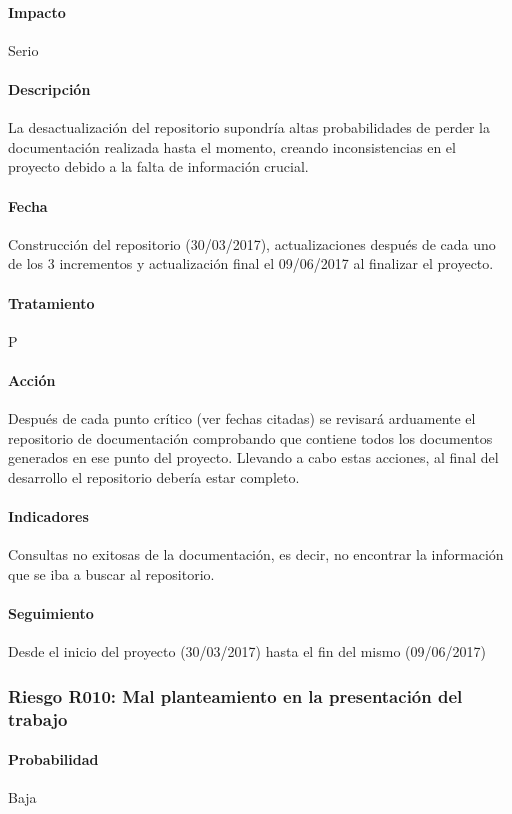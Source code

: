 \documentclass[10pt,a4paper]{article}
\begin{document}
				\paragraph{Impacto}	Serio
				\paragraph{Descripción} La desactualización del repositorio supondría altas probabilidades de perder la documentación realizada hasta el momento, creando inconsistencias en el proyecto debido a la falta de información crucial. 
				\paragraph{Fecha} Construcción del repositorio (30/03/2017), actualizaciones después de cada uno de los 3 incrementos y actualización final el 09/06/2017 al finalizar el proyecto.
				\paragraph{Tratamiento} P
				\paragraph{Acción} Después de cada punto crítico (ver fechas citadas) se revisará arduamente el repositorio de documentación comprobando que contiene todos los documentos generados en ese punto del proyecto.	Llevando a cabo estas acciones, al final del desarrollo el repositorio debería estar completo.			
				\paragraph{Indicadores} Consultas no exitosas de la documentación, es decir, no encontrar la información que se iba a buscar al repositorio.
				\paragraph{Seguimiento}	Desde el inicio del proyecto (30/03/2017) hasta el fin del mismo (09/06/2017)
				
				\subsubsection{Riesgo R010: Mal planteamiento en la presentación del trabajo}
				\paragraph{Probabilidad} Baja
\end{document}
